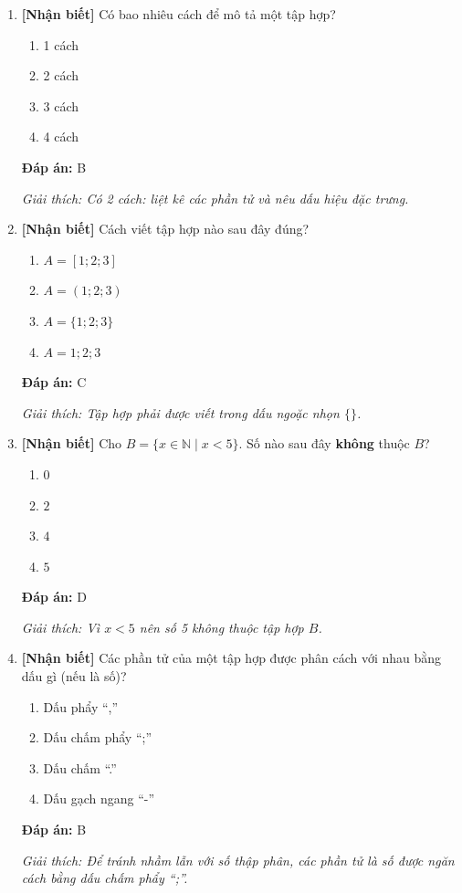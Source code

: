 \documentclass[12pt,a4paper]{article}
\newcommand{\nhanbiet}{\textcolor{nhanbiet}{\textbf{[Nhận biết]}}}
\newcommand{\dapan}[1]{\par\smallskip\textbf{Đáp án:} #1}
\newcommand{\giaithich}[1]{\par\textit{Giải thích: #1}}
\begin{document}
\begin{enumerate}[label=\textbf{Câu \arabic*.}]
    \item \nhanbiet{} Có bao nhiêu cách để mô tả một tập hợp?
    \begin{enumerate}[label=\Alph*.]
        \item 1 cách
        \item 2 cách
        \item 3 cách
        \item 4 cách
    \end{enumerate}
    \dapan{B}
    \giaithich{Có 2 cách: liệt kê các phần tử và nêu dấu hiệu đặc trưng.}

    \item \nhanbiet{} Cách viết tập hợp nào sau đây đúng?
    \begin{enumerate}[label=\Alph*.]
        \item $A = [1; 2; 3]$
        \item $A = (1; 2; 3)$
        \item $A = \{1; 2; 3\}$
        \item $A = 1; 2; 3$
    \end{enumerate}
    \dapan{C}
    \giaithich{Tập hợp phải được viết trong dấu ngoặc nhọn $\{ \}$.}

    \item \nhanbiet{} Cho $B = \{x \in \mathbb{N} \mid x < 5\}$. Số nào sau đây \textbf{không} thuộc $B$?
    \begin{enumerate}[label=\Alph*.]
        \item $0$
        \item $2$
        \item $4$
        \item $5$
    \end{enumerate}
    \dapan{D}
    \giaithich{Vì $x < 5$ nên số 5 không thuộc tập hợp $B$.}

    \item \nhanbiet{} Các phần tử của một tập hợp được phân cách với nhau bằng dấu gì (nếu là số)?
    \begin{enumerate}[label=\Alph*.]
        \item Dấu phẩy ``,''
        \item Dấu chấm phẩy ``;''
        \item Dấu chấm ``.''
        \item Dấu gạch ngang ``-''
    \end{enumerate}
    \dapan{B}
    \giaithich{Để tránh nhầm lẫn với số thập phân, các phần tử là số được ngăn cách bằng dấu chấm phẩy ``;''.}


\end{enumerate}
\end{document}
